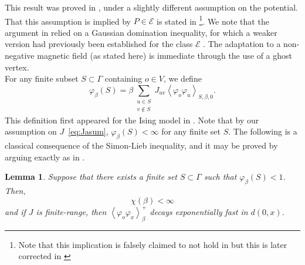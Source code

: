 \documentclass{article}
\newtheorem{lemma}[theorem]{Lemma}
\numberwithin{equation}{section}
\theoremstyle{definition}
\theoremstyle{definition}
\theoremstyle{remark}
\newcommand\vp{\varphi}
\newcommand\Ec{\mathcal{E}}
\newcommand{\G}{\Gamma}
\begin{document}
This result was proved in \cite[Theorem 6.1]{BFS}, under a slightly different assumption on the potential. That this assumption is implied by $P \in \Ec$ is stated in \cite[Section 4]{brydges1983random}{\hypersetup{linkcolor=black}\footnote{Note that this implication is falsely claimed to not hold in \cite{BFS} but this is later corrected in \cite{brydges1983random}}}. 
We note that the argument in \cite{BFS} relied on a Gaussian domination inequality, for which a weaker version had previously been established for the class $\Ec$ \cite{newman,simon2026phase}. The adaptation to a non-negative magnetic field (as stated here) is immediate through the use of a ghost vertex.
\\[1em]
\noindent For any finite subset $S \subset \G$ containing $o \in V$, we define
\[
	\vp_\beta\left( S\right) = \beta \sum_{\substack{u \in S \\ v \not\in S}} J_{uv} \left< \vp_o \vp_u \right>_{S,\beta,0}.
\] 
This definition first appeared for the Ising model in \cite{DCT}.
Note that by our assumption on $J$~\eqref{eq:Jasum}, $\vp_\beta(S) < \infty$ for any finite set $S$.
The following is a classical consequence of the Simon-Lieb inequality, and it may be proved by arguing exactly as in \cite{DCT}.
\begin{lemma}\label{lemma:expdecay}
	Suppose that there exists a finite set $S \subset \G$ such that $\vp_\beta(S) < 1$. Then,
	\[
	\chi(\beta) < \infty
	\] 
	and if $J$ is finite-range, then $\left< \vp_o \vp_x \right>^+_\beta$ decays exponentially fast in $d(0,x)$.
\end{lemma}
\end{document}
